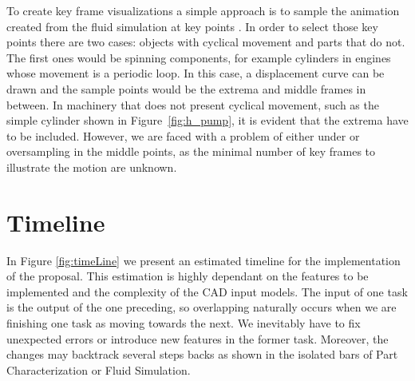 To create key frame visualizations a simple approach is to sample the animation created from the fluid simulation at key points \cite{Mitra2010}.
In order to select those key points there are two cases: objects with cyclical movement and parts that do not.
The first ones would be spinning components, for example cylinders in engines whose movement is a periodic loop.
In this case, a displacement curve can be drawn and the sample points would be the extrema and middle frames in between.
In machinery that does not present cyclical movement, such as the simple cylinder shown in Figure~\ref{fig:h_pump}, it is evident that the extrema have to be included.
However, we are faced with a problem of either under or oversampling in the middle points, as the minimal number of key frames to illustrate the motion are unknown. 

\section{Timeline}

In Figure \ref{fig:timeLine} we present an estimated timeline for the implementation of the proposal.
This estimation is highly dependant on the features to be implemented and the complexity of the CAD input models.
The input of one task is the output of the one preceding, so overlapping naturally occurs when we are finishing one task as moving towards the  next.
We inevitably have to fix unexpected errors or introduce new features in the former task.
Moreover, the changes may backtrack several steps backs as shown in the isolated bars of Part Characterization or Fluid Simulation.

